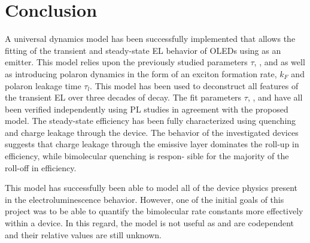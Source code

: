 \documentclass[../thesis.tex]{subfiles}
\begin{document}
\section{Conclusion}

A universal dynamics model has been successfully implemented that allows the fitting of the transient and steady-state EL behavior of OLEDs using \irppy as an emitter. 
This model relies upon the previously studied parameters $\tau$, \ktt, and \ktp as well as introducing polaron dynamics in the form of an exciton formation rate, $k_F$ and polaron leakage time $\tau_l$. 
This model has been used to deconstruct all features of the transient EL over three decades of decay. The fit parameters $\tau$, \ktt, and \ktp have all been verified independently using PL studies in agreement with the proposed model. 
The steady-state efficiency has been fully characterized using quenching and charge leakage through the device. 
The behavior of the investigated devices suggests that charge leakage through the emissive layer dominates the roll-up in efficiency, while bimolecular quenching is respon- sible for the majority of the roll-off in efficiency.

This model has successfully been able to model all of the device physics present in the electroluminescence behavior.  However, one of the initial goals of this project was to be able to quantify the bimolecular rate constants more effectively within a device.  In this regard, the model is not useful as \ktt and \ktp are codependent and their relative values are still unknown.  

\end{document}
